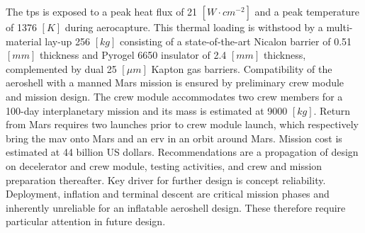 \newline
\newline
The \acrlong{tps} is exposed to a peak heat flux of 21 $\left[W \cdot cm^{-2}\right]$ and a peak temperature of 1376 $\left[K\right]$ during aerocapture. This thermal loading is withstood by a multi-material lay-up 256 $\left[kg\right]$ consisting of a state-of-the-art Nicalon barrier of 0.51 $\left[mm\right]$ thickness and Pyrogel 6650 insulator of 2.4 $\left[mm\right]$ thickness, complemented by dual 25 $\left[\mu m\right]$ Kapton gas barriers. 
\newline
\newline
Compatibility of the aeroshell with a manned Mars mission is ensured by preliminary crew module and mission design. The crew module accommodates two crew members for a 100-day interplanetary mission and its mass is estimated at 9000 $\left[kg\right]$. Return from Mars requires two launches prior to crew module launch, which respectively bring the \acrlong{mav} onto Mars and an \acrlong{erv} in an orbit around Mars. Mission cost is estimated at 44 billion US dollars.
\newline
\newline
Recommendations are a propagation of design on decelerator and crew module, testing activities, and crew and mission preparation thereafter. Key driver for further design is concept reliability. Deployment, inflation and terminal descent are critical mission phases and inherently unreliable for an inflatable aeroshell design. These therefore require particular attention in future design.
